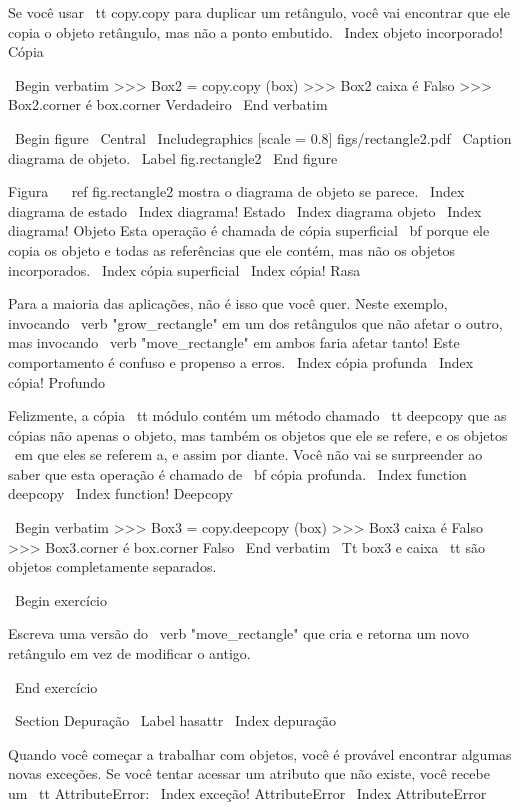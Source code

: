 \documentclass[10pt]{book}
\begin{document}
\begin {itemize}
{{{{{{{{{{{{{Se você usar {\ tt copy.copy} para duplicar um retângulo, você vai encontrar
que ele copia o objeto retângulo, mas não a ponto embutido.
\ Index {objeto incorporado! Cópia}

\ Begin {verbatim}
>>> Box2 = copy.copy (box)
>>> Box2 caixa é
Falso
>>> Box2.corner é box.corner
Verdadeiro
\ End {verbatim}

\ Begin {figure}
\ Central
{\ Includegraphics [scale = 0.8] {figs/rectangle2.pdf}}
\ Caption {diagrama de objeto.}
\ Label {} fig.rectangle2
\ End {figure}

Figura ~ \ ref {} fig.rectangle2 mostra o diagrama de objeto se parece.
\ Index {diagrama de estado}
\ Index {diagrama! Estado}
\ Index {diagrama objeto}
\ Index {diagrama! Objeto}
Esta operação é chamada de {cópia superficial \ bf} porque ele copia os
objeto e todas as referências que ele contém, mas não os objetos incorporados.
\ Index {cópia superficial}
\ Index {cópia! Rasa}

Para a maioria das aplicações, não é isso que você quer. Neste exemplo,
invocando \ verb "grow_rectangle" em um dos retângulos que não
afetar o outro, mas invocando \ verb "move_rectangle" em ambos faria
afetar tanto! Este comportamento é confuso e propenso a erros.
\ Index {cópia profunda}
\ Index {cópia! Profundo}

Felizmente, a cópia {\ tt} módulo contém um método chamado {\ tt
deepcopy} que as cópias não apenas o objeto, mas também 
os objetos que ele se refere, e os objetos {\ em que eles se referem a},
e assim por diante.
Você não vai se surpreender ao saber que esta operação é
chamado de {\ bf cópia profunda}.
\ Index {function deepcopy}
\ Index {function! Deepcopy}

\ Begin {verbatim}
>>> Box3 = copy.deepcopy (box)
>>> Box3 caixa é
Falso
>>> Box3.corner é box.corner
Falso
\ End {verbatim}
%
{\ Tt box3} e {caixa \ tt} são objetos completamente separados.


\ Begin {} exercício

Escreva uma versão do \ verb "move_rectangle" que cria e
retorna um novo retângulo em vez de modificar o antigo.

\ End {} exercício


\ Section {} Depuração
\ Label {} hasattr
\ Index {depuração}

Quando você começar a trabalhar com objetos, você é provável encontrar
algumas novas exceções. Se você tentar acessar um atributo
que não existe, você recebe um {\ tt AttributeError}:
\ Index {exceção! AttributeError}
\ Index {} AttributeError

}}}}}}}}}}}}}
\end{itemize}
\end{document}
